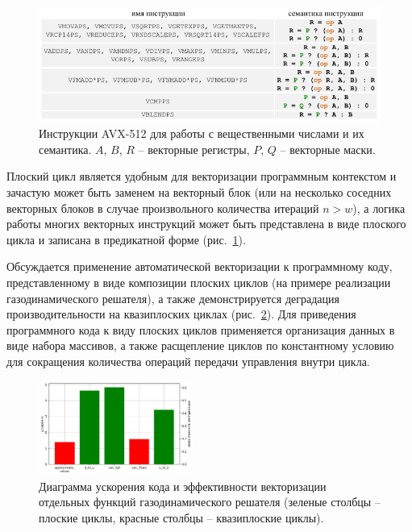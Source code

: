 \documentclass[a4paper,14pt]{extarticle}                     %
\theoremstyle{plain}                                         %
\begin{document}
\begin{figure}[!ht]
\centering
\includegraphics[width=1.0\textwidth]{./fig/vec_avx512_semantic_table.pdf}
\singlespacing
\caption{Инструкции AVX-512 для работы с вещественными числами и их семантика. $A$, $B$, $R$ -- векторные регистры, $P$, $Q$ -- векторные маски.}
\label{fig:vec_avx512_semantic_table}
\end{figure}

Плоский цикл является удобным для векторизации программным контекстом и зачастую может быть заменем на векторный блок (или на несколько соседних векторных блоков в случае произвольного количества итераций $n > w$), а логика работы многих векторных инструкций может быть представлена в виде плоского цикла и записана в предикатной форме (рис.~\ref{fig:vec_avx512_semantic_table}).

Обсуждается применение автоматической векторизации к программному коду, представленному в виде композиции плоских циклов (на примере реализации газодинамического решателя), а также демонстрируется деградация производительности на квазиплоских циклах (рис.~\ref{fig:text_4_ibm_diagr2}).
Для приведения программного кода к виду плоских циклов применяется организация данных в виде набора массивов, а также расщепление циклов по константному условию для сокращения количества операций передачи управления внутри цикла.

\begin{figure}[!ht]
\centering
\includegraphics[width=0.45\textwidth]{./pics/text_4_ibm/diagr2.png}
\singlespacing
\caption{Диаграмма ускорения кода и эффективности векторизации отдельных функций газодинамического решателя (зеленые столбцы -- плоские циклы, красные столбцы -- квазиплоские циклы).}
\label{fig:text_4_ibm_diagr2}
\end{figure}
\end{document}
